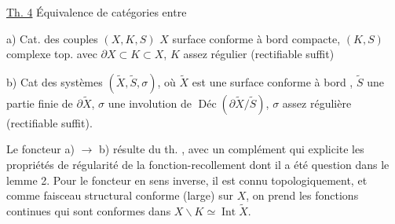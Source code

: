 
\uline{Th. 4} Équivalence de catégories entre

a) Cat. des couples $(X,K,S)$ $X$ surface conforme à bord compacte, $(K,S)$ complexe top.   avec $\partial X\subset K\subset X$, $K$ assez régulier (rectifiable suffit)


b) Cat des systèmes $(\widetilde X,\widetilde S,\sigma)$, où $\widetilde X$ est une surface conforme à bord , $\widetilde S$ une partie finie de $\partial\widetilde X$, $\sigma$ une involution de $\operatorname{Déc}(\partial\widetilde X/\widetilde S)$, $\sigma$ assez régulière (rectifiable suffit).

Le foncteur a) $\longrightarrow$ b) résulte du th. , avec un complément qui explicite les propriétés de régularité de la fonction-recollement dont il a été question dans le lemme 2. Pour le foncteur en sens inverse, il est connu topologiquement, et comme faisceau structural conforme (large) sur $X$, on prend les fonctions continues qui sont conformes dans $X\smallsetminus K\simeq\operatorname{Int}\widetilde X$.
